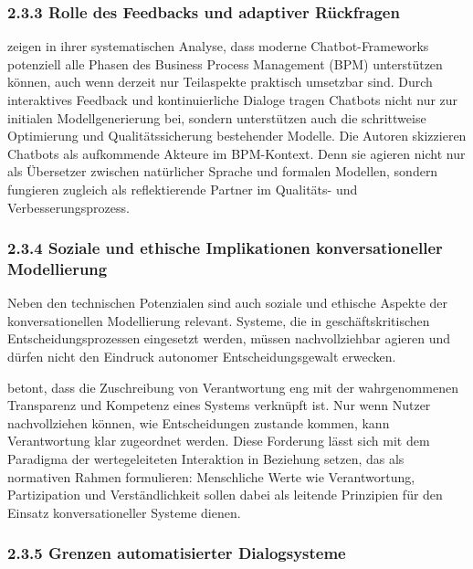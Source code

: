 \documentclass[a4paper,12pt]{scrreprt}
\begin{document}
\subsubsection*{2.3.3 Rolle des Feedbacks und adaptiver Rückfragen}

\citet[S.~425--430]{Klievtsova2023} zeigen in ihrer systematischen Analyse, dass moderne Chatbot-Frameworks potenziell alle Phasen des Business Process Management (\ac{BPM}) unterstützen können, auch wenn derzeit nur Teilaspekte praktisch umsetzbar sind. Durch interaktives Feedback und kontinuierliche Dialoge tragen Chatbots nicht nur zur initialen Modellgenerierung bei, sondern unterstützen auch die schrittweise Optimierung und Qualitätssicherung bestehender Modelle. Die Autoren skizzieren Chatbots als aufkommende Akteure im BPM-Kontext. Denn sie agieren nicht nur als Übersetzer zwischen natürlicher Sprache und formalen Modellen, sondern fungieren zugleich als reflektierende Partner im Qualitäts- und Verbesserungsprozess.

\subsubsection*{2.3.4 Soziale und ethische Implikationen konversationeller Modellierung}

Neben den technischen Potenzialen sind auch soziale und ethische Aspekte der konversationellen Modellierung relevant. 
Systeme, die in geschäftskritischen Entscheidungsprozessen eingesetzt werden, müssen nachvollziehbar agieren und dürfen nicht den Eindruck autonomer Entscheidungsgewalt erwecken. 

\citet[S.~10--13]{FigueroaTorres2024} betont, dass die Zuschreibung von Verantwortung eng mit der wahrgenommenen Transparenz und Kompetenz eines Systems verknüpft ist. 
Nur wenn Nutzer nachvollziehen können, wie Entscheidungen zustande kommen, kann Verantwortung klar zugeordnet werden. 
Diese Forderung lässt sich mit dem Paradigma der wertegeleiteten Interaktion in Beziehung setzen, das \citet[S.~216--226]{ElstermannEtAl2023} als normativen Rahmen formulieren: 
Menschliche Werte wie Verantwortung, Partizipation und Verständlichkeit sollen dabei als leitende Prinzipien für den Einsatz konversationeller Systeme dienen.

\subsubsection*{2.3.5 Grenzen automatisierter Dialogsysteme}
\end{document}
